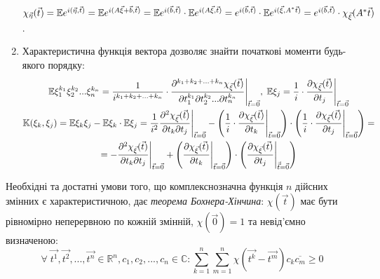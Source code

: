\begin{enumerate}
    $\chi_{\vec{\eta}}(\vec{t}) = \mathbb{E} e^{i(\vec{\eta}, \vec{t})} = \mathbb{E} e^{i(A\vec{\xi} + \vec{b}, \vec{t})}=
    \mathbb{E} e^{i(\vec{b}, \vec{t})} \cdot \mathbb{E} e^{i(A\vec{\xi}, \vec{t})} = e^{i(\vec{b}, \vec{t})} \cdot \mathbb{E} e^{i(\vec{\xi}, A^{*}\vec{t})} = e^{i(\vec{b}, \vec{t})} \cdot \chi_{\vec{\xi}}(A^{*}\vec{t})$.
    \item Характеристична функція вектора дозволяє знайти початкові моменти будь-якого порядку:
    \begin{gather*}
        \mathbb{E}\xi_1^{k_1} \xi_2^{k_2} ... \xi_n^{k_n} = \frac{1}{i^{k_1 + k_2 + ... + k_n}} \cdot \frac{\partial^{k_1 + k_2 + ... + k_n}\chi_{\vec{\xi}}(\vec{t})}{\partial t_1^{k_1} \partial t_2^{k_2} ... \partial t_n^{k_n}} \Biggr \vert_{\vec{t} = \vec{0}}, 
        \; \mathbb{E}\xi_j = \frac{1}{i} \cdot\frac{\partial \chi_{\vec{\xi}}(\vec{t})}{\partial t_j} \Biggr \vert_{\vec{t} = \vec{0}} \\
        \mathbb{K}(\xi_k, \xi_j) = \mathbb{E}\xi_k\xi_j - \mathbb{E}\xi_k\cdot \mathbb{E}\xi_j = \frac{1}{i^2} \frac{\partial^2 \chi_{\vec{\xi}}(\vec{t})}{\partial t_k \partial t_j} \Biggr \vert_{\vec{t} = \vec{0}} - 
        \left( \frac{1}{i} \cdot\frac{\partial \chi_{\vec{\xi}}(\vec{t})}{\partial t_k} \Biggr \vert_{\vec{t} = \vec{0}}\right) \cdot \left( \frac{1}{i} \cdot\frac{\partial \chi_{\vec{\xi}}(\vec{t})}{\partial t_j} \Biggr \vert_{\vec{t} = \vec{0}}\right) = \\
        = -\frac{\partial^2 \chi_{\vec{\xi}}(\vec{t})}{\partial t_k \partial t_j} \Biggr \vert_{\vec{t} = \vec{0}} + 
        \left(\frac{\partial \chi_{\vec{\xi}}(\vec{t})}{\partial t_k} \Biggr \vert_{\vec{t} = \vec{0}}\right) \cdot \left(\frac{\partial \chi_{\vec{\xi}}(\vec{t})}{\partial t_j} \Biggr \vert_{\vec{\vec{t}} = \vec{0}}\right)\end{gather*}
\end{enumerate}

Необхідні та достатні умови того, що комплекснозначна функція $n$ дійсних змінних є характеристичною, дає
\emph{теорема Бохнера-Хінчина}: $\chi(\vec{t})$ має бути рівномірно неперервною по кожній змінній, $\chi(\vec{0}) = 1$ та 
невід'ємно визначеною: $$
    \forall \; \vec{t^1}, \vec{t^2}, ..., \vec{t^n} \in \mathbb{R}^n, c_1, c_2, ..., c_n \in \mathbb{C}: 
    \sum\limits_{k=1}^n {\sum\limits_{m=1}^n \chi(\vec{t^k} - \vec{t^m}) c_k \overline{c_m}} \geq 0$$